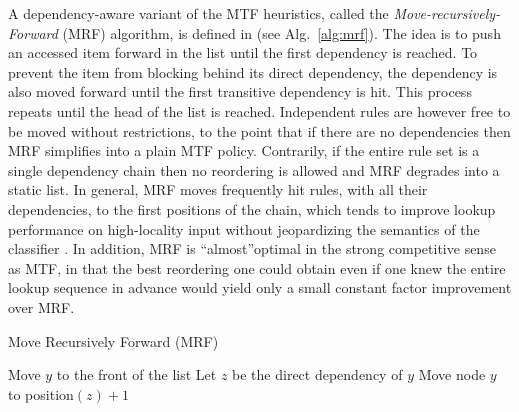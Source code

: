 


A dependency-aware variant of the MTF heuristics, called the \emph{Move-recursively-Forward} (MRF) algorithm, is defined in \cite{10228937} (see Alg.~\ref{alg:mrf}). The idea is to push an accessed item forward in the list until the first dependency is reached. To prevent the item from blocking behind its direct dependency, the dependency is also moved forward until the first transitive dependency is hit. This process repeats until the head of the list is reached.  Independent rules are however free to be moved without restrictions, to the point that if there are no dependencies then MRF simplifies into a plain MTF policy.  Contrarily, if the entire rule set is a single dependency chain then no reordering is allowed and MRF degrades into a static list. In general, MRF moves frequently hit rules, with all their dependencies, to the first positions of the chain, which tends to improve lookup performance on high-locality input without jeopardizing the semantics of the classifier \cite{10228937}. In addition, MRF is ``almost''optimal in the strong competitive sense as MTF, in that the best reordering one could obtain even if one knew the entire lookup sequence in advance would yield only a small constant factor improvement over MRF.

\begin{algorithm}[t]
  \caption{Move Recursively Forward (MRF)}
  \label{alg:mrf}
  \begin{small}
    \begin{algorithmic}[1]
      \State Move $y$ to the front of the list
      \Else
      \State Let $z$ be the direct dependency of $y$
      \State Move node $y$ to position$(z) + 1$
      \State {}
      \EndIf
      \EndProcedure
    \end{algorithmic}
  \end{small}
\end{algorithm}

